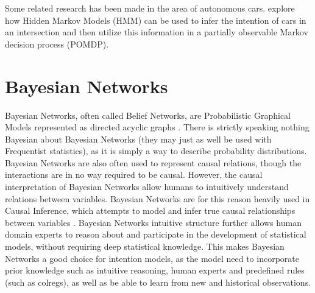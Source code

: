 Some related research has been made in the area of autonomous cars. \cite{song} explore how Hidden Markov Models (HMM) can be used to infer the intention of cars in an intersection and then utilize this information in a partially observable Markov decision process (POMDP). 


\section{Bayesian Networks}
Bayesian Networks, often called Belief Networks, are Probabilistic Graphical Models represented as directed acyclic graphs \cite{murphy}. There is strictly speaking nothing Bayesian about Bayesian Networks (they may just as well be used with Frequentist statistics), as it is simply a way to describe probability distributions. Bayesian Networks are also often used to represent causal relations, though the interactions are in no way required to be causal. However, the causal interpretation of Bayesian Networks allow humans to intuitively understand relations between variables. Bayesian Networks are for this reason heavily used in Causal Inference, which attempts to model and infer true causal relationships between variables \cite{causal}. Bayesian Networks intuitive structure further allows human domain experts to reason about and participate in the development of statistical models, without requiring deep statistical knowledge. 
This makes Bayesian Networks a good choice for intention models, as the model need to incorporate prior knowledge such as intuitive reasoning, human experts and predefined rules (such as \Gls{colregs}), as well as be able to learn from new and historical observations. 

